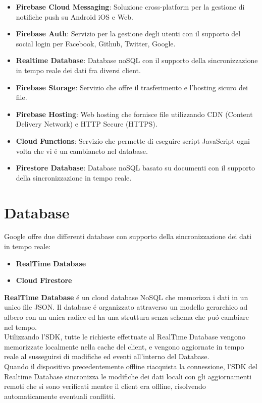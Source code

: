 \begin{itemize}                         %
\item \textbf{Firebase Cloud Messaging}: Soluzione cross-platform per la gestione di notifiche push su Android iOS e Web.

\item \textbf{Firebase Auth}: Servizio per la gestione degli utenti con il supporto del social login per Facebook, Github, Twitter, Google.

\item \textbf{Realtime Database}: Database noSQL con il supporto della sincronizzazione in tempo reale dei dati fra diversi client.

\item \textbf{Firebase Storage}: Servizio che offre il trasferimento e l'hosting sicuro dei file.

\item \textbf{Firebase Hosting}: Web hosting che fornisce file utilizzando CDN (Content Delivery Network) e HTTP Secure (HTTPS).

\item \textbf{Cloud Functions}: Servizio che permette di eseguire script JavaScript  ogni volta che vi \'e un cambianeto nel database.

\item \textbf{Firestore Database}: Database noSQL basato su documenti con il supporto della sincronizzazione in tempo reale.
\end{itemize}




\section{Database}                 %
Google offre due differenti database con supporto della sincronizzazione dei dati in tempo reale:

\begin{itemize}
  \item \textbf{RealTime Database}
  \item \textbf{Cloud Firestore}
\end{itemize}


\textbf{RealTime Database} \'e un cloud database NoSQL che memorizza i dati in un unico file JSON. Il database \'e organizzato attraverso un modello gerarchico ad albero con un unica radice ed ha una struttura senza schema che pu\'o cambiare nel tempo.\\
Utilizzando l'SDK, tutte le richieste effettuate al RealTime Database vengono memorizzate localmente nella cache del client, e vengono aggiornate in tempo reale al susseguirsi di modifiche ed eventi all'interno del Database.\\
Quando il dispositivo precedentemente offline riacquista la connessione, l'SDK del Realtime Database sincronizza le modifiche dei dati locali con gli aggiornamenti remoti che si sono verificati mentre il client era offline, risolvendo automaticamente eventuali conflitti.\\


